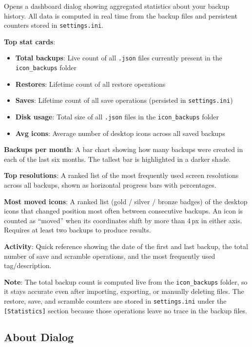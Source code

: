 \documentclass[a4paper,11pt]{article}
\begin{document}
Opens a dashboard dialog showing aggregated statistics about your backup
history. All data is computed in real time from the backup files and
persistent counters stored in \texttt{settings.ini}.

\textbf{Top stat cards}:
\begin{itemize}
  \item \textbf{Total backups}: Live count of all \texttt{.json} files
    currently present in the \texttt{icon\_backups} folder
  \item \textbf{Restores}: Lifetime count of all restore operations
  \item \textbf{Saves}: Lifetime count of all save operations
    (persisted in \texttt{settings.ini})
  \item \textbf{Disk usage}: Total size of all \texttt{.json} files
    in the \texttt{icon\_backups} folder
  \item \textbf{Avg icons}: Average number of desktop icons across
    all saved backups
\end{itemize}

\textbf{Backups per month}: A bar chart showing how many backups were
created in each of the last six months. The tallest bar is highlighted
in a darker shade.

\textbf{Top resolutions}: A ranked list of the most frequently used
screen resolutions across all backups, shown as horizontal progress
bars with percentages.

\textbf{Most moved icons}: A ranked list (gold / silver / bronze
badges) of the desktop icons that changed position most often between
consecutive backups. An icon is counted as ``moved'' when its
coordinates shift by more than 4\,px in either axis. Requires at least
two backups to produce results.

\textbf{Activity}: Quick reference showing the date of the first and
last backup, the total number of save and scramble operations, and the most
frequently used tag/description.

\textbf{Note}: The total backup count is computed live from the
\texttt{icon\_backups} folder, so it stays accurate even after
importing, exporting, or manually deleting files.
The restore, save, and scramble counters are stored in
\texttt{settings.ini} under the \texttt{[Statistics]} section
because those operations leave no trace in the backup files.

\subsection{About Dialog}
\end{document}
